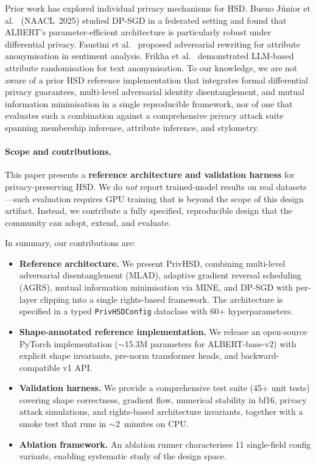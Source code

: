 \documentclass{article}
\begin{document}
Prior work has explored individual privacy mechanisms for HSD.
Bueno J\'unior et al.~\cite{bueno2025privacy} (NAACL~2025) studied DP-SGD in a
federated setting and found that ALBERT's parameter-efficient architecture
is particularly robust under differential privacy.
Faustini et al.~\cite{faustini2025idt} proposed adversarial rewriting for
attribute anonymisation in sentiment analysis.
Frikha et al.~\cite{frikha2025incognitext} demonstrated LLM-based attribute
randomisation for text anonymisation.
To our knowledge, we are not aware of a prior HSD reference implementation
that integrates formal differential privacy guarantees, multi-level adversarial
identity disentanglement, and mutual information minimisation in a single
reproducible framework, nor of one that evaluates such a combination against a
comprehensive privacy attack suite spanning membership inference, attribute
inference, and stylometry.

\paragraph{Scope and contributions.}
This paper presents a \textbf{reference architecture and validation
harness} for privacy-preserving HSD. We do \emph{not} report
trained-model results on real datasets---such evaluation requires GPU
training that is beyond the scope of this design artifact.
Instead, we contribute a fully specified, reproducible design that the
community can adopt, extend, and evaluate.

In summary, our contributions are:

\begin{itemize}
  \item \textbf{Reference architecture.} We present PrivHSD, combining
        multi-level adversarial disentanglement (MLAD), adaptive gradient
        reversal scheduling (AGRS), mutual information minimisation via
        MINE, and DP-SGD with per-layer clipping into a single
        rights-based framework. The architecture is specified in a typed
        \texttt{PrivHSDConfig} dataclass with 60+ hyperparameters.
  \item \textbf{Shape-annotated reference implementation.} We release an
        open-source PyTorch implementation ($\sim$15.3M parameters for
        ALBERT-base-v2) with explicit shape invariants, pre-norm
        transformer heads, and backward-compatible v1 API.
  \item \textbf{Validation harness.} We provide a comprehensive test suite
        (45+ unit tests) covering shape correctness, gradient flow,
        numerical stability in bf16, privacy attack simulations, and
        rights-based architecture invariants, together with a smoke test
        that runs in $\sim$2~minutes on CPU.
  \item \textbf{Ablation framework.} An ablation runner characterises
        11 single-field config variants, enabling systematic study of the
        design space.
\end{itemize}
\end{document}
